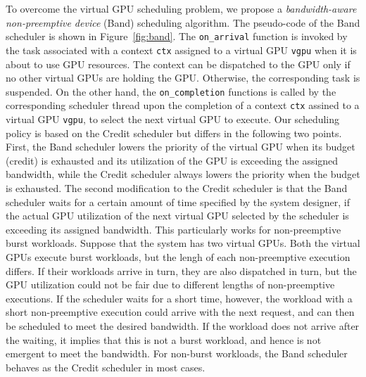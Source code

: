 To overcome the virtual GPU scheduling problem, we propose a
\textit{bandwidth-aware non-preemptive device} (Band) scheduling
algorithm.
The pseudo-code of the Band scheduler is shown in
Figure~\ref{fig:band}.
The \texttt{on\_arrival} function is invoked by the task associated with
a context \texttt{ctx} assigned to a virtual GPU \texttt{vgpu} when
it is about to use GPU resources.
The context can be dispatched to the GPU only if no other virtual GPUs
are holding the GPU.
Otherwise, the corresponding task is suspended.
On the other hand, the \texttt{on\_completion} functions is called by
the corresponding scheduler thread upon the completion of a context
\texttt{ctx} assined to a virtual GPU \texttt{vgpu}, to select the next
virtual GPU to execute. 
Our scheduling policy is based on the Credit scheduler but differs in
the following two points.
First, the Band scheduler lowers the priority of the virtual GPU when
its budget (credit) is exhausted and its utilization of the GPU is
exceeding the assigned bandwidth, while the Credit scheduler always
lowers the priority when the budget is exhausted.
The second modification to the Credit scheduler is that the Band
scheduler waits for a certain amount of time specified by the system
designer, if the actual GPU utilization of the next virtual GPU selected
by the scheduler is exceeding its assigned bandwidth.
This particularly works for non-preemptive burst workloads.
Suppose that the system has two virtual GPUs.
Both the virtual GPUs execute burst workloads, but the lengh of each
non-preemptive execution differs.
If their workloads arrive in turn, they are also dispatched in turn, but
the GPU utilization could not be fair due to different lengths of
non-preemptive executions.
If the scheduler waits for a short time, however, the workload with
a short non-preemptive execution could arrive with the next request, and
can then be scheduled to meet the desired bandwidth.
If the workload does not arrive after the waiting, it implies that this
is not a burst workload, and hence is not emergent to meet the
bandwidth.
For non-burst workloads, the Band scheduler behaves as the Credit
scheduler in most cases.